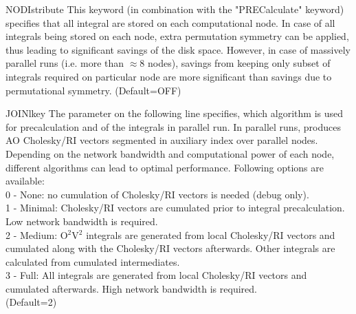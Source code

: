 \begin{keywordlist}
\item[NODIstribute]
This keyword (in combination with the "PRECalculate" keyword) specifies that all
 integral are stored on each computational node. In case of all integrals being
stored on each node, extra permutation symmetry can be applied, thus leading to
significant savings of the disk space. However, in case of massively parallel runs
(i.e. more than $\approx$8 nodes), savings from keeping only subset of integrals
required on particular node are more significant than savings due to permutational
symmetry. (Default=OFF)
\item[JOINlkey]
The parameter on the following line specifies, which algorithm is used for
precalculation and of the integrals in parallel run. In parallel runs, 
produces AO Cholesky/RI vectors segmented in auxiliary index over
parallel nodes. Depending on the network bandwidth and computational power
of each node, different algorithms can lead to optimal performance.
 Following options are available: \\
0 - None: no cumulation of Cholesky/RI vectors is needed (debug only). \\
1 - Minimal: Cholesky/RI vectors are cumulated prior to integral precalculation. Low network bandwidth is required. \\
2 - Medium: O$^{2}$V$^{2}$ integrals are generated from local Cholesky/RI vectors and cumulated along with the Cholesky/RI vectors afterwards.
Other integrals are calculated from cumulated intermediates. \\
3 - Full: All integrals are generated from local Cholesky/RI vectors and cumulated afterwards. High network bandwidth is required. \\
(Default=2)

\end{keywordlist}

